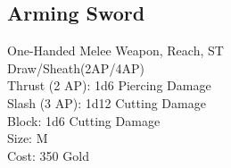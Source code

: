 \subsection{Arming Sword}\label{weapon:armingSword}
One-Handed Melee Weapon,  Reach, ST\\
Draw/Sheath(2AP/4AP)\\
Thrust (2 AP): 1d6 Piercing Damage\\
Slash (3 AP): 1d12 Cutting Damage\\
Block: 1d6 Cutting Damage\\
Size: M\\
Cost: 350 Gold\\
